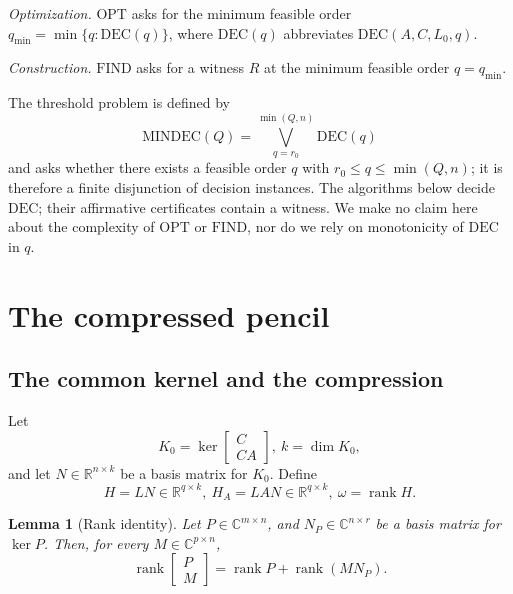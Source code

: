 \documentclass[journal]{IEEEtran}
\theoremstyle{plainn}
\newtheorem{lem}{Lemma}
\theoremstyle{remark}
\begin{document}
\emph{Optimization.} $\mathrm{OPT}$ asks for the minimum feasible order
$q_{\min}=\min\{q:\mathrm{DEC}(q)\}$, where $\mathrm{DEC}(q)$ abbreviates $\mathrm{DEC}(A,C,L_0,q)$.

\emph{Construction.} $\mathrm{FIND}$ asks for a witness $R$ at the minimum feasible order $q=q_{\min}$.

The threshold problem is defined by
\begin{equation}\label{eq:mindec}
\mathrm{MINDEC}(Q)=\bigvee_{q=r_0}^{\min(Q,n)}\mathrm{DEC}(q)
\end{equation}
and asks whether there exists a feasible order $q$ with $r_0\le q\le \min(Q,n)$; it is therefore a finite disjunction of decision instances. The algorithms below decide $\mathrm{DEC}$; their affirmative certificates contain a witness. We make no claim here about the complexity of $\mathrm{OPT}$ or $\mathrm{FIND}$, nor do we rely on monotonicity of $\mathrm{DEC}$ in $q$.

\section{The compressed pencil}\label{sec:compressed}

\subsection{The common kernel and the compression}\label{sec:compress}
Let
\begin{equation*}
	K_0=\ker\begin{bmatrix}C\\ CA\end{bmatrix},\ k=\dim K_0,
\end{equation*}
and let $N\in\mathbb R^{n\times k}$ be a basis matrix for $K_0$. Define
\begin{equation*}
	H=LN\in\mathbb R^{q\times k},\ H_A=LAN\in\mathbb R^{q\times k},\  \omega=\operatorname{rank}H.
\end{equation*}

\begin{lem}[Rank identity]\label{lem:rankid}
	Let $P\in \mathbb{C}^{m\times n}$, and $N_P\in\mathbb C^{n\times r}$ be a basis matrix for $\ker P$. Then, for every $M\in\mathbb{C}^{p\times n}$,
	\begin{equation}\label{eq:rankid}
		\operatorname{rank}\begin{bmatrix}P\\M\end{bmatrix}
		=\operatorname{rank}P+\operatorname{rank}(MN_P).
	\end{equation}
\end{lem}
\end{document}
